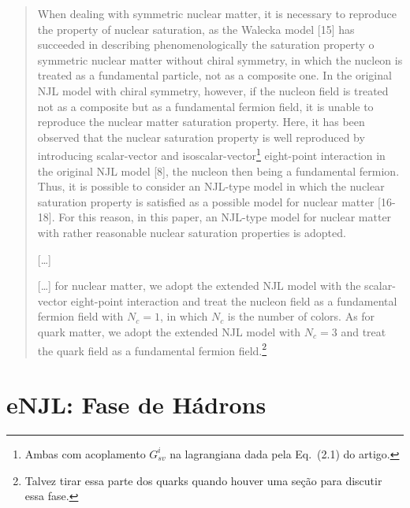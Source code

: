 \begin{quote}
	When dealing with symmetric nuclear matter, it is necessary to reproduce the property of nuclear saturation, as the Walecka model [15] has succeeded in describing phenomenologically the saturation property o symmetric nuclear matter without chiral symmetry, in which the nucleon is treated as a fundamental particle, not as a composite one. In the original NJL model with chiral symmetry, however, if the nucleon field is treated not as a composite but as a fundamental fermion field, it is unable to reproduce the nuclear matter saturation property. Here, it has been observed that the nuclear saturation property is well reproduced by introducing scalar-vector and isoscalar-vector\footnote{Ambas com acoplamento $G_{sv}^i$ na lagrangiana dada pela Eq.~(2.1) do artigo.} eight-point interaction in the original NJL model [8], the nucleon then being a fundamental fermion. Thus, it is possible to consider an NJL-type model in which the nuclear saturation property is satisfied as a possible model for nuclear matter [16-18]. For this reason, in this paper, an NJL-type model for nuclear matter with rather reasonable nuclear saturation properties is adopted.
	
	[\dots]
	
	[\dots] for nuclear matter, we adopt the extended NJL model with the scalar-vector eight-point interaction and treat the nucleon field as a fundamental fermion field with $N_c = 1$, in which $N_c$ is the number of colors. As for quark matter, we adopt the extended NJL model with $N_c = 3$ and treat the quark field as a fundamental fermion field.\footnote{Talvez tirar essa parte dos quarks quando houver uma seção para discutir essa fase.}
\end{quote}


\section{eNJL: Fase de Hádrons}

